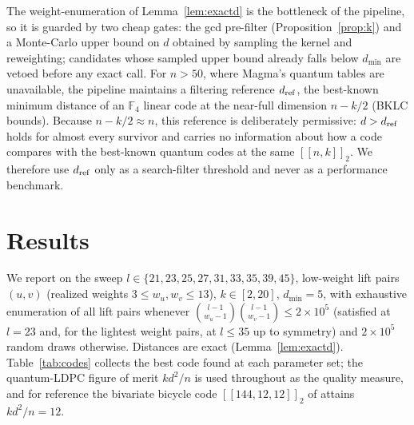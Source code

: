 \documentclass[journal,onecolumn]{IEEEtran}
\theoremstyle{definition}
\theoremstyle{remark}
\newcommand{\F}{\mathbb{F}}
\begin{document}
The weight-enumeration of Lemma~\ref{lem:exactd} is the bottleneck of the
pipeline, so it is guarded by two cheap gates: the gcd pre-filter
(Proposition~\ref{prop:k}) and a Monte-Carlo upper bound on $d$ obtained by
sampling the kernel and reweighting; candidates whose sampled upper bound
already falls below $d_{\min}$ are vetoed before any exact call. For $n>50$,
where Magma's quantum tables are unavailable, the pipeline maintains a
filtering reference $d_{\rm ref}$, the best-known minimum distance of an
$\F_4$ linear code at the near-full dimension $n-k/2$ (BKLC bounds).
Because $n-k/2\approx n$, this reference is deliberately permissive:
$d>d_{\rm ref}$ holds for almost every survivor and carries no information
about how a code compares with the best-known quantum codes at the same
$[[n,k]]_2$. We therefore use $d_{\rm ref}$ only as a search-filter
threshold and never as a performance benchmark.

\section{Results}\label{sec:results}
We report on the sweep
$l\in\{21,23,25,27,31,33,35,39,45\}$,
low-weight lift pairs $(u,v)$ (realized weights $3\le w_u,w_v\le 13$),
$k\in[2,20]$, $d_{\min}=5$, with exhaustive
enumeration of all lift pairs whenever
$\binom{l-1}{w_u-1}\binom{l-1}{w_v-1}\le 2\times10^{5}$ (satisfied at
$l=23$ and, for the lightest weight pairs, at $l\le 35$ up to symmetry)
and $2\times10^{5}$
random draws otherwise. Distances are exact
(Lemma~\ref{lem:exactd}). Table~\ref{tab:codes} collects the best code found
at each parameter set; the quantum-LDPC figure of merit $kd^2/n$ is used
throughout as the quality measure, and for reference the bivariate bicycle
code $[[144,12,12]]_2$ of \cite{BB24} attains $kd^2/n=12$.
\end{document}
